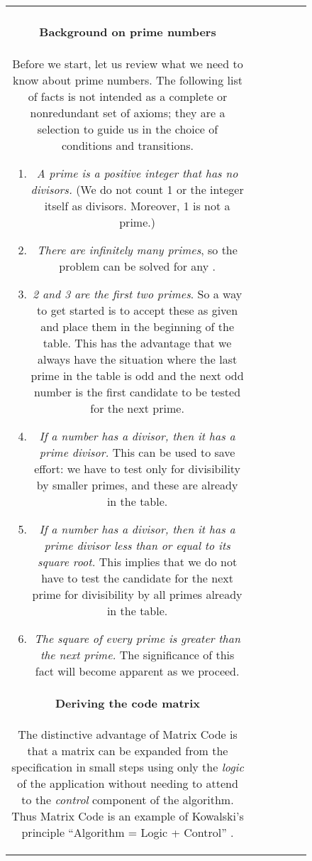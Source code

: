 \documentclass[preprint,11pt]{elsarticle}
\begin{document}
\begin{figure}[htbp]
\begin{center}
\begin{minipage}{4in}
\begin{tabular}{c|c|c|c|c|c}
{\paragraph{Background on prime numbers}
Before we start,
let us review what we need to know about prime numbers.
The following list of facts is not intended as a
complete or nonredundant set of axioms;
they are a selection to guide us in the choice
of conditions and transitions.
\begin{enumerate}
\item
\emph{A prime is a positive integer that has no divisors.}
(We do not count 1 or the integer itself as divisors.
Moreover, 1 is not a prime.)
\item \label{axiom:infinity}
\emph{There are infinitely many primes},
so the problem can be solved for any .
\item \emph{2 and 3 are the first two primes}.
So a way to get started is to accept these as given
and place them in the beginning of the table.
This has the advantage
that we always have the situation
where the last prime in the table is odd
and the next odd number is the first candidate to be tested
for the next prime.
\item \label{axiom:suff}
\emph{If a number has a divisor,
then it has a prime divisor.}
This can be used to save effort:
we have to test only for divisibility by smaller primes,
and these are already in the table.
\item \label{axiom:limit}
\emph{If a number has a divisor,
then it has a prime divisor
less than or equal to its square root.}
This implies that we do not have to test
the candidate for the next prime for divisibility
by all primes already in the table.
\item \label{axiom:square}
\emph{The square of every prime is greater than the next prime.}
The significance of this fact will become apparent as we proceed.
\end{enumerate}

\paragraph{Deriving the code matrix}
The distinctive advantage of Matrix Code is
that a matrix can be expanded from the specification
in small steps using only the \emph{logic}
of the application without needing to attend
to the \emph{control} component of the algorithm.
Thus Matrix Code is an example of Kowalski's principle
``Algorithm = Logic + Control'' \cite{kwl79a}.

}
\end{tabular}
\end{minipage}
\end{center}
\end{figure}
\end{document}
